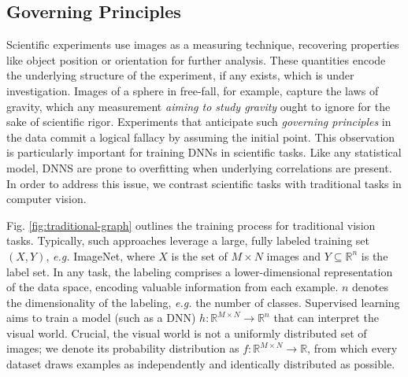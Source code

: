 \documentclass[10pt, journal]{IEEEtran}
\begin{document}
\subsection{Governing Principles}
\label{sec:governing-principles}

Scientific experiments use images as a measuring technique, recovering
properties like object position or orientation for further analysis. These
quantities encode the underlying structure of the experiment, if any exists,
which is under investigation. Images of a sphere in free-fall, for example,
capture the laws of gravity, which any measurement \emph{aiming to study
  gravity} ought to ignore for the sake of scientific rigor. Experiments that
anticipate such \emph{governing principles} in the data commit a logical
fallacy by assuming the initial point. This observation is particularly
important for training DNNs in scientific tasks. Like any statistical model,
DNNS are prone to overfitting when underlying correlations are present. In order
to address this issue, we contrast scientific tasks with traditional tasks in
computer vision.

Fig. \ref{fig:traditional-graph} outlines the training process for traditional
vision tasks. Typically, such approaches leverage a large, fully labeled
training set $(X,Y)$, \textit{e.g.} ImageNet, where $X$ is the set of
$M\times N$ images and $Y\subseteq \mathbb{R}^n$ is the label set. In any task,
the labeling comprises a lower-dimensional representation of the data space,
encoding valuable information from each example. $n$ denotes the dimensionality
of the labeling, \textit{e.g.} the number of classes. Supervised learning aims
to train a model (such as a DNN)
$h : \mathbb{R}^{M\times N} \rightarrow \mathbb{R}^n$ that can interpret the
visual world. Crucial, the visual world is not a uniformly distributed set of
images; we denote its probability distribution as
$f : \mathbb{R}^{M\times N} \rightarrow \mathbb{R}$, from which every dataset
draws examples as independently and identically distributed as possible.
\end{document}
